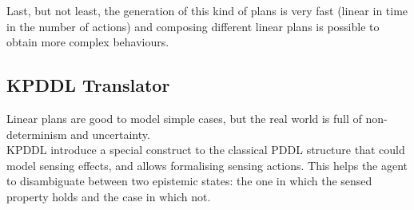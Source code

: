 \documentclass[pdftex,12pt,a4paper]{report}
\begin{document}
Last, but not least, the generation of this kind of plans is very fast (linear in time in the number of actions) and composing different linear plans is possible to obtain more complex behaviours.

\newpage
\subsection{KPDDL Translator}
Linear plans are good to model simple cases, but the real world is full of non-determinism and uncertainty. \\
KPDDL introduce a special construct to the classical PDDL structure that could model sensing effects, and allows formalising sensing actions. This helps the agent to disambiguate between two epistemic states: the one in which the sensed property holds and the case in which not.\\
\newline
{}

\newpage
\end{document}
